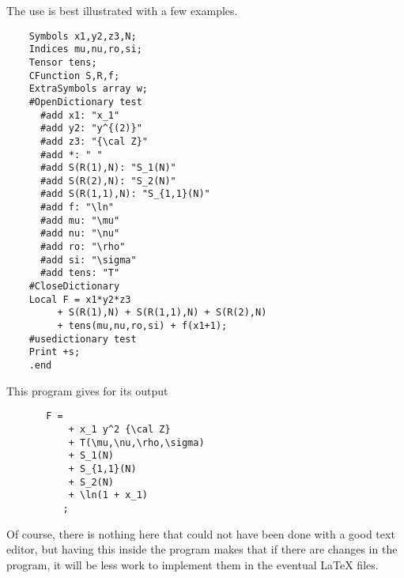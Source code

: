 The use is best illustrated with a few examples.
\begin{verbatim}
    Symbols x1,y2,z3,N;
    Indices mu,nu,ro,si;
    Tensor tens;
    CFunction S,R,f;
    ExtraSymbols array w;
    #OpenDictionary test
      #add x1: "x_1"
      #add y2: "y^{(2)}"
      #add z3: "{\cal Z}"
      #add *: " "
      #add S(R(1),N): "S_1(N)"
      #add S(R(2),N): "S_2(N)"
      #add S(R(1,1),N): "S_{1,1}(N)"
      #add f: "\ln"
      #add mu: "\mu"
      #add nu: "\nu"
      #add ro: "\rho"
      #add si: "\sigma"
      #add tens: "T"
    #CloseDictionary
    Local F = x1*y2*z3
         + S(R(1),N) + S(R(1,1),N) + S(R(2),N)
         + tens(mu,nu,ro,si) + f(x1+1);
    #usedictionary test
    Print +s;
    .end
\end{verbatim}
This program gives for its output
\begin{verbatim}
       F =
           + x_1 y^2 {\cal Z}
           + T(\mu,\nu,\rho,\sigma)
           + S_1(N)
           + S_{1,1}(N)
           + S_2(N)
           + \ln(1 + x_1)
          ;
\end{verbatim}
Of course, there is nothing here that could not have been done with a good 
text editor, but having this inside the \FORM{} program makes that if there 
are changes in the \FORM{} program, it will be less work to implement them in 
the eventual \LaTeX{} files.

